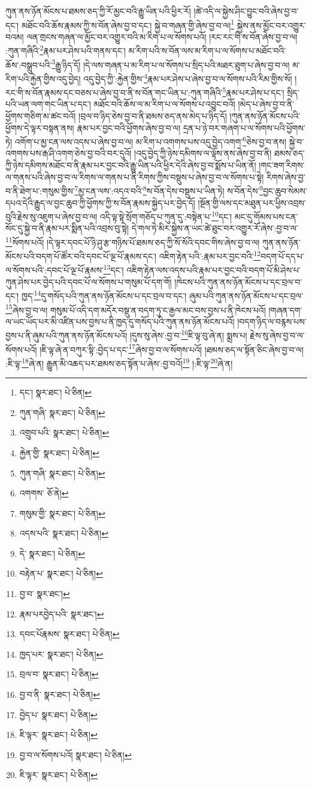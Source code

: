 ཀུན་ནས་ཉོན་མོངས་པ་ཐམས་ཅད་ཀྱི་རོ་མྱང་བའི་རྒྱུ་ཡིན་པའི་ཕྱིར་རོ། །ཚེ་འདི་ལ་སྐྱེས་ཤིང་བྱུང་བའི་ཞེས་བྱ་བ་དང་། མཐོང་བའི་ཆོས་རྣམས་ཀྱི་ས་བོན་ཞེས་བྱ་བ་དང་། སྐྱེ་བ་གཞན་གྱི་ཞེས་བྱ་བ་ལ།\footnote{དང་།  སྣར་ཐང་།  པེ་ཅིན། } སྐྱེས་ནས་མྱོང་བར་འགྱུར་བའམ། ལན་གྲངས་གཞན་ལ་མྱོང་བར་འགྱུར་བའི་མ་རིག་པ་ལ་སོགས་པའོ། །རང་རང་གི་ས་བོན་ཞེས་བྱ་བ་ལ། :ཀུན་གཞིའི་\footnote{ཀུན་གཞི་  སྣར་ཐང་།  པེ་ཅིན། }རྣམ་པར་ཤེས་པའི་གནས་དང་། མ་རིག་པའི་ས་བོན་ལས་མ་རིག་པ་ལ་སོགས་པ་མཐོང་བའི་ཆོས་:བསྒྲུབ་པའི་\footnote{འགྲུབ་པའི་  སྣར་ཐང་།  པེ་ཅིན། }རྒྱུ་ཉིད་དོ། །དེ་ལས་གཞན་པ་མ་རིག་པ་ལ་སོགས་པ་སྲིད་པའི་མཐར་ཐུག་པ་ཞེས་བྱ་བ་ལ། མ་རིག་པའི་རྐྱེན་གྱིས་འདུ་བྱེད། འདུ་བྱེད་ཀྱི་:རྐྱེན་གྱིས་\footnote{རྐྱེན་གྱི་  སྣར་ཐང་།  པེ་ཅིན། }རྣམ་པར་ཤེས་པ་ཞེས་བྱ་བ་ལ་སོགས་པའི་རིམ་གྱིས་སོ། །རང་གི་ས་བོན་རྣམས་དང་བཅས་པ་ཞེས་བྱ་བ་ནི་ས་བོན་གང་ཡིན་པ་:ཀུན་གཞིའི་\footnote{ཀུན་གཞི་  སྣར་ཐང་།  པེ་ཅིན། }རྣམ་པར་ཤེས་པ་དང་། སྲིད་པའི་ཡན་ལག་གང་ཡིན་པ་དང་། མཐོང་བའི་ཆོས་ལ་མ་རིག་པ་ལ་སོགས་པ་འབྱུང་བའོ། །མེད་པ་ཞེས་བྱ་བ་ནི་ཕྱོགས་གཅིག་མ་ཚང་བའོ། །བྲལ་བ་ཉིད་ཅེས་བྱ་བ་ནི་ཐམས་ཅད་ནས་མེད་པ་ཉིད་དོ། །ཀུན་ནས་ཉོན་མོངས་པའི་ཕྱོགས་དེ་ལྟར་བསྟན་ནས། རྣམ་པར་བྱང་བའི་ཕྱོགས་ཞེས་བྱ་བ་ལ། དྲན་པ་ཉེ་བར་གཞག་པ་ལ་སོགས་པའི་ཕྱོགས་ཏེ། འགོག་པ་མྱ་ངན་ལས་འདས་པ་ཞེས་བྱ་བ་ལ། མ་རིག་པ་འགགས་པས་འདུ་བྱེད་འགག་\footnote{འགགས་  ཅོ་ནེ། }ཅེས་བྱ་བ་ནས། སྐྱེ་བ་འགགས་པས་རྒ་ཤི་འགག་ཅེས་བྱ་བའི་བར་དུའོ། །འདུ་བྱེད་ཀྱི་ཉེས་དམིགས་ལ་ལྟོས་ནས་ཞེས་བྱ་བ་ནི། ཐམས་ཅད་ཀྱི་ཉེས་དམིགས་མཐོང་བ་ནི་རྣམ་པར་བྱང་བའི་རྒྱུ་ཡིན་པའི་ཕྱིར་དེའི་ཞེས་བྱ་བ་སྨོས་པ་ཡིན་ནོ། །གང་ཟག་རིགས་ལ་གནས་པའི་ཞེས་བྱ་བ་ལ་རིགས་ལ་གནས་པ་ནི་རིགས་ཀྱིས་བསྡུས་པ་ཞེས་བྱ་བ་ལ་སོགས་པ་སྟེ། རིགས་ཞེས་བྱ་བ་ནི་ཐེག་པ་:གསུམ་གྱིས་\footnote{གསུམ་གྱི་  སྣར་ཐང་།  པེ་ཅིན། }མྱ་ངན་ལས་:འདའ་བའི་\footnote{འདས་པའི་  སྣར་ཐང་།  པེ་ཅིན། }ས་བོན་དེས་བསྡུས་པ་ཡིན་ཏེ། ས་བོན་དེས་\footnote{དེ་  སྣར་ཐང་།  པེ་ཅིན། }བྱང་ཆུབ་སེམས་དཔའ་དེའི་རྒྱུད་ལ་བྱང་ཆུབ་ཀྱི་ཕྱོགས་ཀྱི་ས་བོན་རྣམས་སྐྱེད་པར་བྱེད་དོ། །སྔོན་གྱི་ལས་དང་མཐུན་པར་ཕྱིས་འབྲས་བུའི་རྗེས་སུ་འཇུག་པ་ཞེས་བྱ་བ་ལ། འདི་ལྟ་སྟེ་སྲོག་གཅོད་པ་ཀུན་དུ་:བསྟེན་པ་\footnote{བརྟེན་པ་  སྣར་ཐང་།  པེ་ཅིན། }དང་། མང་དུ་གོམས་པས་ངན་སོང་དུ་སྐྱེ་བ་ནི་རྣམ་པར་སྨིན་པའི་འབྲས་བུ་སྟེ། དེ་གལ་ཏེ་མིར་སྐྱེས་ན་ཡང་ཚེ་ཐུང་བར་འགྱུར་རོ་ཞེས་:བྱ་བ་ལ་\footnote{བྱ་བ་  སྣར་ཐང་། }སོགས་པའོ། །དེ་ལྟར་དབང་པོ་ཉི་ཤུ་རྩ་གཉིས་པོ་ཐམས་ཅད་ཀྱི་སོ་སོའི་དབང་གིས་ཞེས་བྱ་བ་ལ། ཀུན་ནས་ཉོན་མོངས་པའི་བདག་པོ་ཚོར་བའི་དབང་པོ་ལྔ་པོ་རྣམས་དང་། འཇིག་རྟེན་པའི་:རྣམ་པར་བྱང་བའི་\footnote{རྣམ་པརབྱེད་པའི་  སྣར་ཐང་། }བདག་པོ་དད་པ་ལ་སོགས་པའི་:དབང་པོ་ལྔ་པོ་རྣམས་\footnote{དབང་པོརྣམས་  སྣར་ཐང་།  པེ་ཅིན། }དང་། འཇིག་རྟེན་ལས་འདས་པའི་རྣམ་པར་བྱང་བའི་བདག་པོ་མི་ཤེས་པ་ཀུན་ཤེས་པར་བྱེད་པའི་དབང་པོ་ལ་སོགས་པ་གསུམ་པོ་དག་གོ། །ཁེངས་པའི་ཀུན་ནས་ཉོན་མོངས་པ་དང་བྲལ་བ་དང་། ཁྱད་\footnote{ཁྱད་པར་  སྣར་ཐང་།  པེ་ཅིན། }དུ་གསོད་པའི་ཀུན་ནས་ཉོན་མོངས་པ་དང་བྲལ་བ་དང་། ཞུམ་པའི་ཀུན་ནས་ཉོན་མོངས་པ་དང་བྲལ་\footnote{བྲལ་བ་  སྣར་ཐང་།  པེ་ཅིན། }ཞེས་བྱ་བ་ལ། གསུམ་པོ་འདི་དག་མདོར་བསྡུ་ན་བདག་ཏུ་ང་རྒྱལ་མང་བས་བྱས་པ་ནི་ཁེངས་པའོ། །གཞན་དག་ལ་ཡང་ཡོད་པར་མི་འཛིན་པས་བྱས་པ་ནི་ཁྱད་དུ་གསོད་པའི་ཀུན་ནས་ཉོན་མོངས་པའོ། །བདག་ཉིད་ལ་བརྙས་པས་བྱས་པ་ནི་ཞུམ་པའི་ཀུན་ནས་ཉོན་མོངས་པའོ། །དུས་སུ་ཞེས་:བྱ་བ་\footnote{བྱ་བ་ནི་  སྣར་ཐང་།  པེ་ཅིན། }ཇི་ལྟ་བུ་ཞེ་ན། སྨྲས་པ། རྗེས་སུ་ཞེས་བྱ་བ་ལ་སོགས་པའོ། །ཇི་ལྟ་ཞེ་ན་བཀུར་སྟི་:བྱེད་པ་དང་\footnote{བྱེད་པ་  སྣར་ཐང་།  པེ་ཅིན། }ཞེས་བྱ་བ་ལ་སོགས་པའོ། །ཐམས་ཅད་ལ་སྟོན་ཅིང་ཞེས་བྱ་བ་ལ། :ཇི་ལྟ་\footnote{ཇི་ལྟར་  སྣར་ཐང་།  པེ་ཅིན། }ཞེ་ན། རྒྱུན་མི་འཆད་པར་ཐམས་ཅད་སྟོན་པ་ཞེས་:བྱ་བའོ།\footnote{བྱ་བ་ལ་སོགས་པའོ།  སྣར་ཐང་།  པེ་ཅིན། } །:ཇི་ལྟ་\footnote{ཇི་ལྟར་  སྣར་ཐང་།  པེ་ཅིན། }ཞེ་ན། 